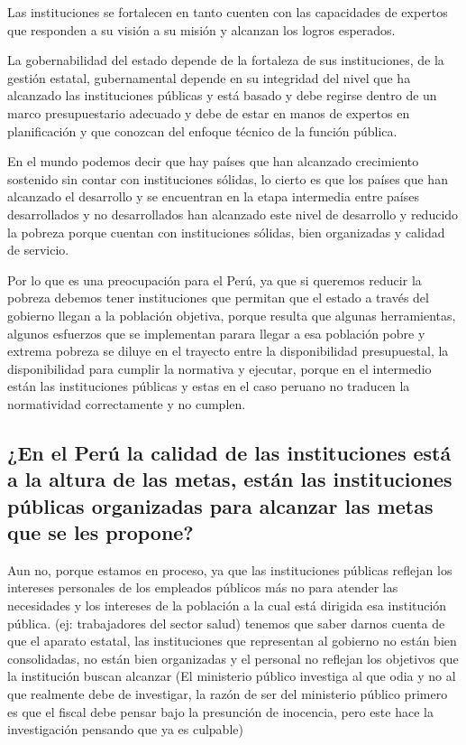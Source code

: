 \documentclass[
  a4paper,
]{article}
\begin{document}
Las instituciones se fortalecen en tanto cuenten con las capacidades de
expertos que responden a su visión a su misión y alcanzan los logros
esperados.

La gobernabilidad del estado depende de la fortaleza de sus
instituciones, de la gestión estatal, gubernamental depende en su
integridad del nivel que ha alcanzado las instituciones públicas y está
basado y debe regirse dentro de un marco presupuestario adecuado y debe
de estar en manos de expertos en planificación y que conozcan del
enfoque técnico de la función pública.

En el mundo podemos decir que hay países que han alcanzado crecimiento
sostenido sin contar con instituciones sólidas, lo cierto es que los
países que han alcanzado el desarrollo y se encuentran en la etapa
intermedia entre países desarrollados y no desarrollados han alcanzado
este nivel de desarrollo y reducido la pobreza porque cuentan con
instituciones sólidas, bien organizadas y calidad de servicio.

Por lo que es una preocupación para el Perú, ya que si queremos reducir
la pobreza debemos tener instituciones que permitan que el estado a
través del gobierno llegan a la población objetiva, porque resulta que
algunas herramientas, algunos esfuerzos que se implementan parara llegar
a esa población pobre y extrema pobreza se diluye en el trayecto entre
la disponibilidad presupuestal, la disponibilidad para cumplir la
normativa y ejecutar, porque en el intermedio están las instituciones
públicas y estas en el caso peruano no traducen la normatividad
correctamente y no cumplen.

\subsection{¿En el Perú la calidad de las instituciones está a la altura
de las metas, están las instituciones públicas organizadas para alcanzar
las metas que se les
propone?}\label{en-el-peruxfa-la-calidad-de-las-instituciones-estuxe1-a-la-altura-de-las-metas-estuxe1n-las-instituciones-puxfablicas-organizadas-para-alcanzar-las-metas-que-se-les-propone}

Aun no, porque estamos en proceso, ya que las instituciones públicas
reflejan los intereses personales de los empleados públicos más no para
atender las necesidades y los intereses de la población a la cual está
dirigida esa institución pública. (ej: trabajadores del sector salud)
tenemos que saber darnos cuenta de que el aparato estatal, las
instituciones que representan al gobierno no están bien consolidadas, no
están bien organizadas y el personal no reflejan los objetivos que la
institución buscan alcanzar (El ministerio público investiga al que odia
y no al que realmente debe de investigar, la razón de ser del ministerio
público primero es que el fiscal debe pensar bajo la presunción de
inocencia, pero este hace la investigación pensando que ya es culpable)
\end{document}
